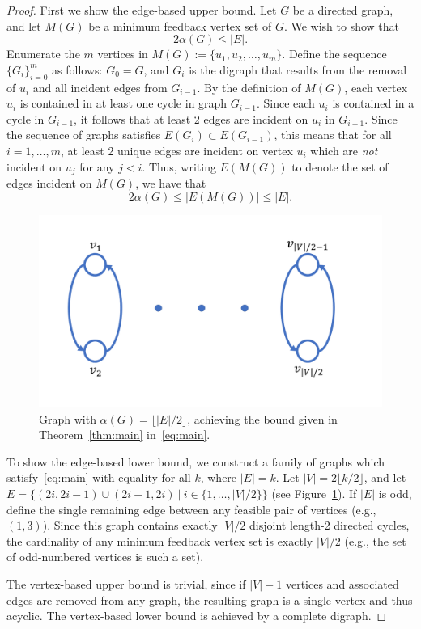 \documentclass[CRMATH,Unicode,manuscript]{cedram}
\begin{document}
\begin{proof}
First we show the edge-based upper bound.
Let $G$ be a directed graph, and let $M(G)$ be a minimum feedback vertex set of $G$.
We wish to show that 
\begin{equation}
2\alpha(G)\leq |E|.
\end{equation}
Enumerate the $m$ vertices in $M(G):=\{u_1,u_2,\ldots,u_m\}$.
Define the sequence $\{G_i\}_{i=0}^m$ as follows: $G_0=G$, and $G_i$ is the digraph that results from the removal of $u_i$ and all incident edges from $G_{i-1}$.
By the definition of $M(G)$, each vertex $u_i$ is contained in at least one cycle in graph $G_{i-1}$.
Since each $u_i$ is contained in a cycle in $G_{i-1}$, it follows that at least 2 edges are incident on $u_i$ in $G_{i-1}$.
Since the sequence of graphs satisfies $E(G_{i})\subset E(G_{i-1})$, this means that for all $i=1,\ldots,m$, at least 2 unique edges are incident on vertex $u_i$ which are \emph{not} incident on $u_j$ for any $j<i$.
%
Thus, writing $E(M(G))$ to denote the set of edges incident on $M(G)$, we have that
\begin{equation}
2\alpha(G)\leq|E(M(G))|\leq |E|.
\end{equation}

\begin{figure}[b]
\centering
\includegraphics[width=.5\textwidth]{gfx/graph}
\caption{\label{fig:graph} Graph with $\alpha(G)=\lfloor|E|/2\rfloor$, achieving the bound given in Theorem~\ref{thm:main} in~\eqref{eq:main}.}
\end{figure}

To show the edge-based lower bound, we construct a family of graphs which satisfy~\eqref{eq:main} with equality for all $k$, where $|E|=k$.
Let $|V|=2\lfloor k/2\rfloor$, and let $E=\{(2i,2i-1)\cup(2i-1,2i)\ |\ i\in\{1,\ldots,|V|/2\}\}$ (see Figure~\ref{fig:graph}).
If $|E|$ is odd, define the single remaining edge between any feasible pair of vertices (e.g., $(1,3)$).
Since this graph contains exactly $|V|/2$ disjoint length-2 directed cycles, the cardinality of any minimum feedback vertex set is exactly $|V|/2$ (e.g., the set of odd-numbered vertices is such a set).
%


The vertex-based upper bound is trivial, since if $|V|-1$ vertices and associated edges are removed from any graph, the resulting graph is a single vertex and thus acyclic.
The vertex-based lower bound is achieved by a complete digraph.
\end{proof}








\end{document}
